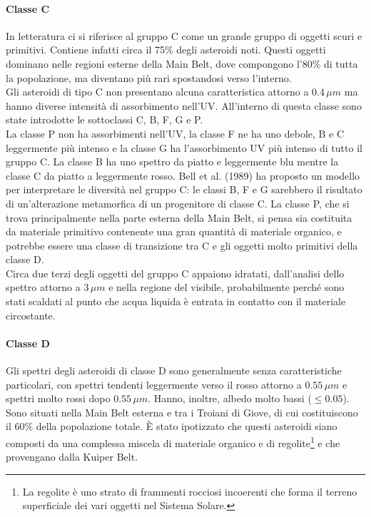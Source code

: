 \documentclass[a4paper,11pt,openright]{book}
\begin{document}
\paragraph*{Classe C}
In letteratura ci si riferisce al gruppo C come un grande gruppo di oggetti scuri e primitivi. Contiene infatti circa il 75\% degli asteroidi noti. Questi oggetti dominano nelle regioni esterne della Main Belt, dove compongono l'80\% di tutta la popolazione, ma diventano più rari spostandosi verso l'interno.\\
Gli asteroidi di tipo C non presentano alcuna caratteristica attorno a $0.4\,\mu m$ ma hanno diverse intensità di assorbimento nell'UV. All'interno di questa classe sono state introdotte le sottoclassi C, B, F, G e P.\\
La classe P non ha assorbimenti nell'UV, la classe F ne ha uno debole, B e C leggermente più intenso e la classe G ha l'assorbimento UV più intenso di tutto il gruppo C. La classe B ha uno spettro da piatto e leggermente blu mentre la classe C da piatto a leggermente rosso. Bell et al. (1989) ha proposto un modello per interpretare le diversità nel gruppo C: le classi B, F e G sarebbero il risultato di un'alterazione metamorfica di un progenitore di classe C. La classe P, che si trova principalmente nella parte esterna della Main Belt, si pensa sia costituita da materiale primitivo contenente una gran quantità di materiale organico, e potrebbe essere una classe di transizione tra C e gli oggetti molto primitivi della classe D.\\
Circa due terzi degli oggetti del gruppo C appaiono idratati, dall'analisi dello spettro attorno a $3\,\mu m$ e nella regione del visibile, probabilmente perché sono stati scaldati al punto che acqua liquida è entrata in contatto con il materiale circostante.

\paragraph*{Classe D}
Gli spettri degli asteroidi di classe D sono generalmente senza caratteristiche particolari, con spettri tendenti leggermente verso il rosso attorno a $0.55\,\mu m$ e spettri molto rossi dopo $0.55\,\mu m$. Hanno, inoltre, albedo molto bassi ($\leq 0.05$).\\
Sono situati nella Main Belt esterna e tra i Troiani di Giove, di cui costituiscono il 60\% della popolazione totale. È stato ipotizzato che questi asteroidi siano composti da una complessa miscela di materiale organico e di regolite\footnote{La regolite è uno strato di frammenti rocciosi incoerenti che forma il terreno superficiale dei vari oggetti nel Sistema Solare.} e che provengano dalla Kuiper Belt.
\end{document}
